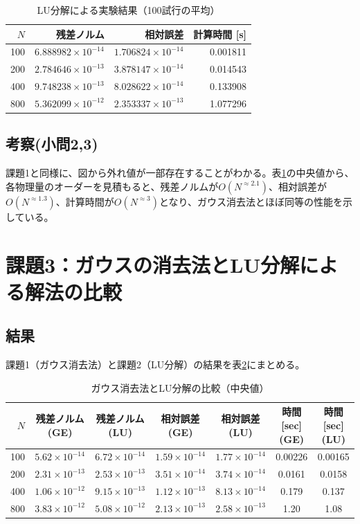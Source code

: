 \documentclass[a4paper,11pt]{ltjsarticle}
\begin{document}
\begin{table}[H]
\centering
\caption{LU分解による実験結果（100試行の平均）}
\label{tab:exp2_summary}
\begin{tabular}{r|r|r|r}
\hline
$N$ & 残差ノルム & 相対誤差 & 計算時間 [s] \\
\hline
100 & $6.888982\times10^{-14}$ & $1.706824\times10^{-14}$ & 0.001811 \\
200 & $2.784646\times10^{-13}$ & $3.878147\times10^{-14}$ & 0.014543 \\
400 & $9.748238\times10^{-13}$ & $8.028622\times10^{-14}$ & 0.133908 \\
800 & $5.362099\times10^{-12}$ & $2.353337\times10^{-13}$ & 1.077296 \\
\hline
\end{tabular}
\end{table}
\subsection{考察(小問2,3)}
課題1と同様に、図から外れ値が一部存在することがわかる。表\ref{tab:exp2_summary}の中央値から、各物理量のオーダーを見積もると、残差ノルムが$O(N^{\approx 2.1})$、相対誤差が$O(N^{\approx 1.3})$、計算時間が$O(N^{\approx 3})$となり、ガウス消去法とほぼ同等の性能を示している。

\section{課題3：ガウスの消去法とLU分解による解法の比較}
\subsection{結果}
課題1（ガウス消去法）と課題2（LU分解）の結果を表\ref{tab:compare_elim_lu}にまとめる。

\begin{table}[H]
\centering
\caption{ガウス消去法とLU分解の比較（中央値）}
\label{tab:compare_elim_lu}
\begin{tabular}{r|cc|cc|cc}
\hline
$N$ & 残差ノルム(GE) & 残差ノルム(LU) & 相対誤差(GE) & 相対誤差(LU) & 時間[sec](GE) & 時間[sec](LU) \\
\hline
100 & $5.62\times10^{-14}$ & $6.72\times10^{-14}$ & $1.59\times10^{-14}$ & $1.77\times10^{-14}$ & 0.00226 & 0.00165 \\
200 & $2.31\times10^{-13}$ & $2.53\times10^{-13}$ & $3.51\times10^{-14}$ & $3.74\times10^{-14}$ & 0.0161 & 0.0158 \\
400 & $1.06\times10^{-12}$ & $9.15\times10^{-13}$ & $1.12\times10^{-13}$ & $8.13\times10^{-14}$ & 0.179 & 0.137 \\
800 & $3.83\times10^{-12}$ & $5.08\times10^{-12}$ & $2.13\times10^{-13}$ & $2.58\times10^{-13}$ & 1.20 & 1.08 \\
\hline
\end{tabular}
\end{table}
\end{document}
